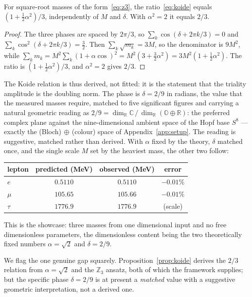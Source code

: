 \begin{proposition}\label{prop:koide}
For square-root masses of the form~\eqref{eq:z3}, the ratio~\eqref{eq:koide} equals
$(1 + \tfrac12\alpha^2)/3$, independently of $M$ and $\delta$. With $\alpha^2 = 2$ it equals $2/3$.
\end{proposition}

\begin{proof}
The three phases are spaced by $2\pi/3$, so $\sum_k \cos(\delta + 2\pi k/3) = 0$ and
$\sum_k \cos^2(\delta + 2\pi k/3) = \tfrac32$. Then $\sum_k\sqrt{m_k} = 3M$, so the denominator is
$9M^2$, while $\sum_k m_k = M^2\sum_k(1+\alpha\cos)^2 = M^2(3 + \tfrac32\alpha^2) = 3M^2(1+\tfrac12\alpha^2)$.
The ratio is $(1+\tfrac12\alpha^2)/3$, and $\alpha^2=2$ gives $2/3$.
\end{proof}

The Koide relation is thus derived, not fitted: it is the statement that the triality amplitude is
the doubling norm. The phase is $\delta = 2/9$ in radians, the value that the measured masses
require, matched to five significant figures and carrying a natural geometric reading as
$2/9 = \dim_{\mathbb{R}}\mathbb{C} \,/\, \dim_{\mathbb{R}}(\mathbb{O}\oplus\mathbb{R})$: the
preferred complex plane against the nine-dimensional ambient space of the Hopf base $S^8$ ---
exactly the (Bloch)$\,\oplus\,$(colour) space of Appendix~\ref{app:setup}. The reading is
suggestive, matched rather than derived. With $\alpha$ fixed by the theory, $\delta$ matched once,
and the single scale $M$ set by the heaviest mass, the other two follow:

\begin{center}
\begin{tabular}{lccc}
\hline
lepton & predicted (MeV) & observed (MeV) & error \\
\hline
$e$    & $0.5110$  & $0.5110$  & $-0.01\%$ \\
$\mu$  & $105.65$  & $105.66$  & $-0.01\%$ \\
$\tau$ & $1776.9$  & $1776.9$  & (scale) \\
\hline
\end{tabular}
\end{center}

This is the showcase: three masses from one dimensional input and no free dimensionless parameters,
the dimensionless content being the two theoretically fixed numbers $\alpha=\sqrt2$ and $\delta=2/9$.

We flag the one genuine gap squarely. Proposition~\ref{prop:koide} derives the $2/3$ relation from
$\alpha=\sqrt2$ and the $\mathbb{Z}_3$ ansatz, both of which the framework supplies; but the specific
phase $\delta = 2/9$ is at present a \emph{matched} value with a suggestive geometric interpretation,
not a derived one.

